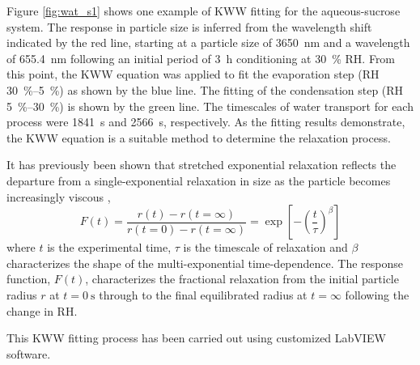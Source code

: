 Figure \ref{fig:wat_s1} shows one example of KWW fitting for the aqueous-sucrose system. The response in particle size is inferred from the wavelength shift indicated by the red line, starting at a particle size of \SI{3650}{\nano\meter} and a wavelength of \SI{655.4}{\nano\meter} following an initial period of \SI{3}{\hour} conditioning at \SI{30}{\percent} RH. From this point, the KWW equation was applied to fit the evaporation step (RH \SIrange{30}{5}{\percent}) as shown by the blue line. The fitting of the condensation step (RH \SIrange{5}{30}{\percent}) is shown by the green line. The timescales of water transport for each process were \SI{1841}{\second} and \SI{2566}{\second}, respectively. As the fitting results demonstrate, the KWW equation is a suitable method to determine the relaxation process. 

It has previously been shown that stretched exponential relaxation reflects the departure from a single-exponential relaxation in size as the particle becomes increasingly viscous \cite{Rickards2015},
\begin{equation}\label{eqn:wat_si_1}
F(t)=\frac{r(t)-r(t=\infty)}{r(t=0)-r(t=\infty)}=\exp \left[-\left(\frac{t}{\tau}\right)^{\beta}\right]
\end{equation}
where $t$ is the experimental time, $\tau$ is the timescale of relaxation and $\beta$ characterizes the shape of the multi-exponential time-dependence. The response function, $F(t)$, characterizes the fractional relaxation from the initial particle radius $r$ at $t=\SI{0}{\second}$ through to the final equilibrated radius at $t=\infty$ following the change in RH.

This KWW fitting process has been carried out using customized LabVIEW software.

